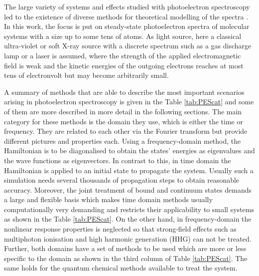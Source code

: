 The large variety of systems and effects studied with photoelectron spectroscopy led to the existence of diverse methods for theoretical modelling of the spectra \cite{PESbook, x-ray}.
In this work, the focus is put on steady-state photoelectron spectra of molecular systems with a size up to some tens of atoms.
As light source, here a classical ultra-violet or soft X-ray source with a discrete spectrum such as a gas discharge lamp or a laser is assumed, where the strength of the applied electromagnetic field is weak and the kinetic energies of the outgoing electrons reaches at most tens of electronvolt but may become arbitrarily small.

A summary of methods that are able to describe the most important scenarios arising in photoelectron spectroscopy is given in the Table \ref{tab:PEScat} and some of them are more described in more detail in the following sections.
The main category for these methods is the domain they use, which is either the time or frequency.
They are related to each other via the Fourier transform but provide different pictures and properties each.
Using a frequency-domain method, the Hamiltonian is to be diagonalised to obtain the states' energies as eigenvalues and the wave functions as eigenvectors.
In contrast to this, in time domain the Hamiltonian is applied to an initial state to propagate the system.
Usually such a simulation needs several thousands of propagation steps to obtain reasonable accuracy.
Moreover, the joint treatment of bound and continuum states demands a large and flexible basis which makes time domain methods usually computationally very demanding and restricts their applicability to small systems as shown in the Table \ref{tab:PEScat}.
On the other hand, in frequency-domain the nonlinear response properties is neglected so that strong-field effects such as multiphoton ionisation and high harmonic generation (HHG) can not be treated.
Further, both domains have a set of methods to be used which are more or less specific to the domain as shown in the third column of Table \ref{tab:PEScat}.
The same holds for the quantum chemical methods available to treat the system.
